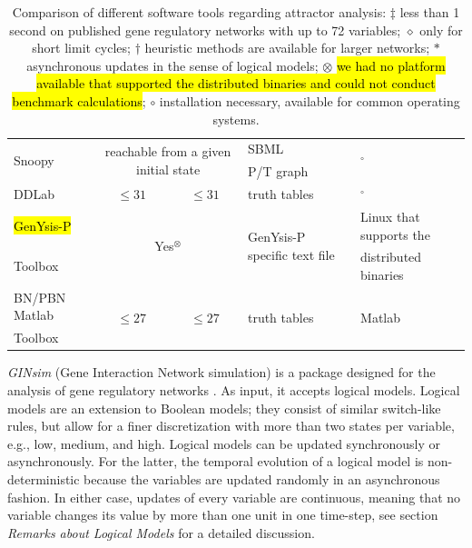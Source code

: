 \documentclass[10pt]{bmc_article}
\newenvironment{bmcformat}{\begin{raggedright}\baselineskip20pt\sloppy\setboolean{publ}{false}}{\end{raggedright}\baselineskip20pt\sloppy}
\begin{document}
\begin{bmcformat}
\begin{table}
\begin{tabular}{|l|c|c|l|l|}
    \multirow{2}{*}{Snoopy} & \multicolumn{2}{|c|}{\multirow{2}{*}{reachable from a given initial state }} & SBML &\multirow{2}{*}{$^\circ$}  \\
      &\multicolumn{2}{|c|}{} & P/T graph &\\
    \hline
	
		DDLab & $\leq 31$ & $\leq 31$  & truth tables & $^\circ$\\
		\hline
		
		\hl{GenYsis-P } & \multicolumn{2}{|c|}{\multirow{2}{*}{Yes$^\otimes$}} & \multirow{2}{*}{GenYsis-P specific text file} & Linux that supports the \\ 
		Toolbox & \multicolumn{2}{|c|}{}  & &distributed binaries\\
		\hline
	
		BN/PBN Matlab  & \multirow{2}{*}{$\leq 27$} & \multirow{2}{*}{$\leq 27$ } & \multirow{2}{*}{truth tables} & \multirow{2}{*}{Matlab}\\
		Toolbox & & & \\
		\hline

	\end{tabular} 
	\caption{
	Comparison of different software tools regarding attractor analysis:
	$\ddagger$ less than 1 second
  		on published gene regulatory networks with up to 72 variables; 
	$\diamond$
  		only for short limit cycles;
	$ \dagger$ heuristic methods are available for larger networks; 
	$*$ asynchronous updates in the sense of logical models;
	$\otimes$ \hl{we had no platform available that supported the distributed binaries and could not conduct benchmark calculations};
		$\circ$ installation necessary, available for common operating systems.}
  \label{table:comparison}
\end{table}
	
{\it GINsim} (Gene Interaction Network simulation) is a package designed for the
analysis of gene regulatory networks \cite{GINsim}. As input, it accepts
logical models. Logical models are an extension to Boolean models; they
consist of similar switch-like rules, but allow for a finer discretization with more
than two states per variable, e.g., low, medium, and high. Logical models can be updated synchronously or asynchronously. For the latter, the temporal
evolution of a logical model is non-deterministic because the variables are updated randomly in an asynchronous
fashion. In either case, updates of every variable are continuous, meaning that no variable changes its value by more than one unit in one time-step, see section {\it Remarks about Logical Models} for a detailed discussion. 


\end{bmcformat}
\end{document}
